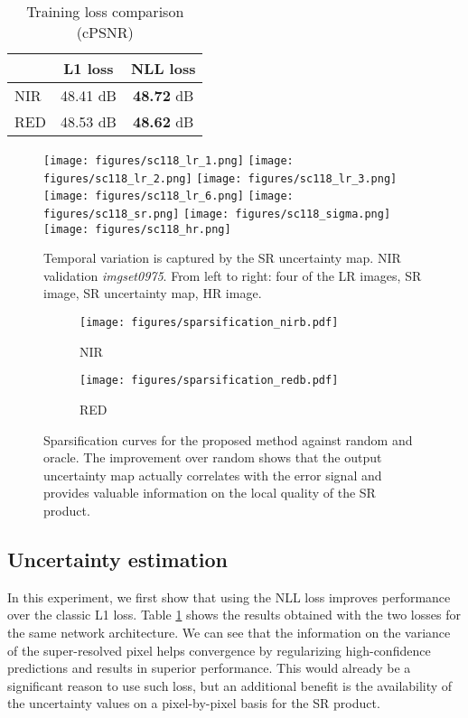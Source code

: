 \documentclass[journal]{IEEEtran}
\begin{document}
\begin{table}[]
    \centering
    \caption{Training loss comparison (cPSNR) }
    \label{table:nll}
\begin{tabular}{lcc}
    & L1 loss & NLL loss \\ \hline \hline
NIR & 48.41 dB  & \textbf{48.72} dB   \\
RED & 48.53 dB  & \textbf{48.62} dB   \\
\hline
\end{tabular}
\end{table}


\begin{figure*}[t]
    \centering
    \texttt{[image: figures/sc118\_lr\_1.png]}
    \texttt{[image: figures/sc118\_lr\_2.png]}
    \texttt{[image: figures/sc118\_lr\_3.png]}
\texttt{[image: figures/sc118\_lr\_6.png]}
\texttt{[image: figures/sc118\_sr.png]}
    \texttt{[image: figures/sc118\_sigma.png]}
    \texttt{[image: figures/sc118\_hr.png]}
    \caption{Temporal variation is captured by the SR uncertainty map. NIR validation \textit{imgset0975}. From left to right: four of the LR images, SR image, SR uncertainty map, HR image.}
    \label{fig:temporal_uncertainty}
\end{figure*}


\begin{figure*}[t]
    \centering
    \begin{subfigure}[b]{0.45\textwidth}
    \centering
    \texttt{[image: figures/sparsification\_nirb.pdf]}
    \caption{NIR}
    \end{subfigure}
    \begin{subfigure}[b]{0.45\textwidth}
    \centering
    \texttt{[image: figures/sparsification\_redb.pdf]}
    \caption{RED}
    \end{subfigure}
    \caption{Sparsification curves for the proposed method against random and oracle. The improvement over random shows that the output uncertainty map actually correlates with the error signal and provides valuable information on the local quality of the SR product.}
    \label{fig:sparsification}
\end{figure*}

\subsection{Uncertainty estimation}
\label{sec:nll_ablation}
In this experiment, we first show that using the NLL loss improves performance over the classic L1 loss. Table \ref{table:nll} shows the results obtained with the two losses for the same network architecture. We can see that the information on the variance of the super-resolved pixel helps convergence by regularizing high-confidence predictions and results in superior performance. This would already be a significant reason to use such loss, but an additional benefit is the availability of the uncertainty values on a pixel-by-pixel basis for the SR product. 
\end{document}
